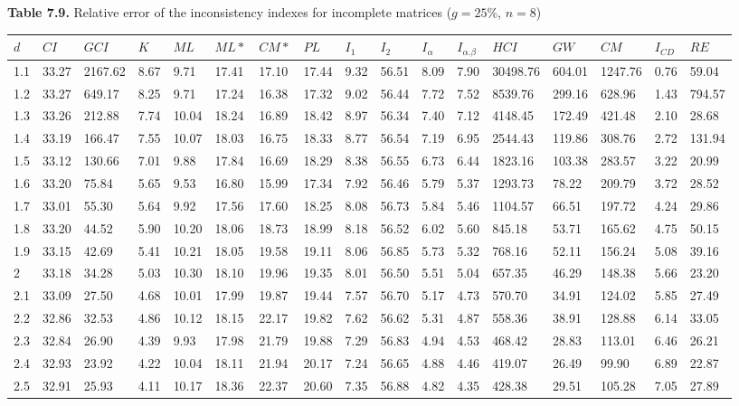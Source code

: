 \newpage
\textbf{Table 7.9.} Relative error of the inconsistency indexes for incomplete matrices ($g=25\%$, $n=8$)
\begin{adjustbox}{angle=90}
  \begin{center}
    \begin{tabular}{|l|llllllllllllllll|}
      \hline $d$ &
$CI$&$GCI$&$K$&$ML$&$ML*$&$CM*$&$PL$&$I_1$&$I_2$&$I_{\alpha}$&$I_{\alpha.\beta}$&$HCI$&$GW$&$CM$&$I_{CD}$&$RE$\\ \hline \hline
1.1&33.27&2167.62&8.67&9.71&17.41&17.10&17.44&9.32&56.51&8.09&7.90&30498.76&604.01&1247.76&0.76&59.04  \\ 
1.2&33.27&649.17&8.25&9.71&17.24&16.38&17.32&9.02&56.44&7.72&7.52&8539.76&299.16&628.96&1.43&794.57  \\ 
1.3&33.26&212.88&7.74&10.04&18.24&16.89&18.42&8.97&56.34&7.40&7.12&4148.45&172.49&421.48&2.10&28.68  \\ 
1.4&33.19&166.47&7.55&10.07&18.03&16.75&18.33&8.77&56.54&7.19&6.95&2544.43&119.86&308.76&2.72&131.94  \\ 
1.5&33.12&130.66&7.01&9.88&17.84&16.69&18.29&8.38&56.55&6.73&6.44&1823.16&103.38&283.57&3.22&20.99  \\ 
1.6&33.20&75.84&5.65&9.53&16.80&15.99&17.34&7.92&56.46&5.79&5.37&1293.73&78.22&209.79&3.72&28.52  \\ 
1.7&33.01&55.30&5.64&9.92&17.56&17.60&18.25&8.08&56.73&5.84&5.46&1104.57&66.51&197.72&4.24&29.86  \\ 
1.8&33.20&44.52&5.90&10.20&18.06&18.73&18.99&8.18&56.52&6.02&5.60&845.18&53.71&165.62&4.75&50.15  \\ 
1.9&33.15&42.69&5.41&10.21&18.05&19.58&19.11&8.06&56.85&5.73&5.32&768.16&52.11&156.24&5.08&39.16  \\ 
2&33.18&34.28&5.03&10.30&18.10&19.96&19.35&8.01&56.50&5.51&5.04&657.35&46.29&148.38&5.66&23.20  \\ 
2.1&33.09&27.50&4.68&10.01&17.99&19.87&19.44&7.57&56.70&5.17&4.73&570.70&34.91&124.02&5.85&27.49  \\ 
2.2&32.86&32.53&4.86&10.12&18.15&22.17&19.82&7.62&56.62&5.31&4.87&558.36&38.91&128.88&6.14&33.05  \\ 
2.3&32.84&26.90&4.39&9.93&17.98&21.79&19.88&7.29&56.83&4.94&4.53&468.42&28.83&113.01&6.46&26.21  \\ 
2.4&32.93&23.92&4.22&10.04&18.11&21.94&20.17&7.24&56.65&4.88&4.46&419.07&26.49&99.90&6.89&22.87  \\ 
2.5&32.91&25.93&4.11&10.17&18.36&22.37&20.60&7.35&56.88&4.82&4.35&428.38&29.51&105.28&7.05&27.89  \\ 

\end{tabular}
\end{center}
\end{adjustbox}
